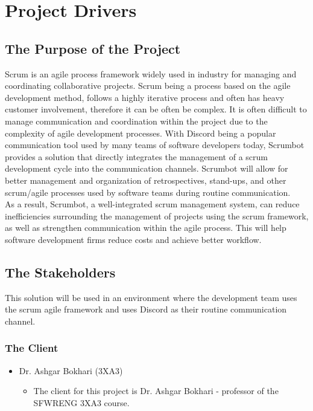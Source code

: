 \documentclass[12pt, titlepage]{article}
\begin{document}
\section{Project Drivers}

\subsection{The Purpose of the Project}
Scrum is an agile process framework widely used in industry for managing and coordinating collaborative projects. Scrum being a process based on the agile development method, follows a highly iterative process and often has heavy customer involvement, therefore it can be often be complex. It is often difficult to manage communication and coordination within the project due to the complexity of agile development processes. With Discord being a popular communication tool used by many teams of software developers today, Scrumbot provides a solution that directly integrates the management of a scrum development cycle into the communication channels. Scrumbot will allow for better management and organization of retrospectives, stand-ups, and other scrum/agile processes used by software teams during routine communication.\\

As a result, Scrumbot, a well-integrated scrum management system, can reduce inefficiencies surrounding the management of projects using the scrum framework, as well as strengthen communication within the agile process. This will help software development firms reduce costs and achieve better workflow.

\subsection{The Stakeholders}
This solution will be used in an environment where the development team uses the scrum agile framework and uses Discord as their routine communication channel.

\subsubsection{The Client}
\begin{itemize}
    \item Dr. Ashgar Bokhari (3XA3)
    \begin{itemize}
      \item[] The client for this project is Dr. Ashgar Bokhari - professor of the SFWRENG 3XA3 course.
    \end{itemize}
\end{itemize}
\end{document}
